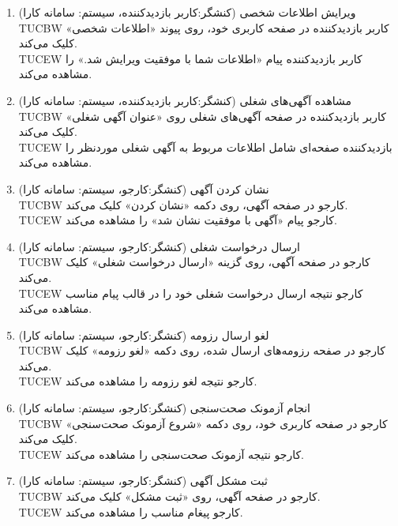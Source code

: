 \documentclass[12pt]{article}
\begin{document}
\begin{enumerate}
		\item
		ویرایش اطلاعات شخصی (کنشگر:‌کاربر بازدید‌کننده، سیستم: سامانه کارا)\\
		TUCBW کاربر بازدید‌کننده در صفحه کاربری خود، روی پیوند «اطلاعات شخصی» کلیک می‌کند.\\
		TUCEW کاربر بازدید‌کننده پیام «اطلاعات شما با موفقیت ویرایش شد.» را مشاهده می‌کند.\\

		\item
		مشاهده آگهی‌های شغلی (کنشگر:‌کاربر بازدید‌کننده، سیستم: سامانه کارا)\\
		TUCBW کاربر بازدید‌کننده در صفحه آگهی‌های شغلی روی «عنوان آگهی شغلی» کلیک می‌کند.\\
		TUCEW بازدید‌کننده صفحه‌ای شامل اطلاعات مربوط به  آگهی شغلی مورد‌نظر را مشاهده می‌کند.\\

		\item
		نشان کردن آگهی (کنشگر:‌کارجو، سیستم: سامانه کارا)\\
		TUCBW کارجو در صفحه آگهی، روی دکمه «نشان کردن» کلیک می‌کند.\\
		TUCEW کارجو پیام «آگهی با موفقیت نشان شد» را مشاهده می‌کند.\\

		\item
		ارسال درخواست شغلی (کنشگر:کارجو، سیستم: سامانه کارا)\faStar\\
		TUCBW کارجو در صفحه آگهی، روی گزینه «ارسال درخواست شغلی» کلیک می‌کند.\\
		TUCEW کارجو نتیجه ارسال درخواست شغلی خود را در قالب پیام مناسب مشاهده می‌کند.\\

		\item
		لغو ارسال رزومه  (کنشگر:‌کارجو، سیستم: سامانه کارا)\\
		TUCBW کارجو در صفحه رزومه‌های ارسال شده، روی دکمه «لغو رزومه» کلیک می‌کند.\\
		TUCEW کارجو نتیجه‌ لغو رزومه را مشاهده می‌کند.\\

		\item
		انجام آزمونک‌ صحت‌سنجی (کنشگر:‌کارجو، سیستم: سامانه کارا)\\
		TUCBW کارجو در صفحه کاربری خود، روی دکمه «شروع آزمونک صحت‌سنجی» کلیک می‌کند.\\
		TUCEW کارجو نتیجه‌ آزمونک صحت‌سنجی را مشاهده می‌کند.\\


		\item
		ثبت مشکل آگهی (کنشگر:‌کارجو، سیستم: سامانه کارا)\faStar\\
		TUCBW کارجو در صفحه آگهی، روی «ثبت مشکل» کلیک می‌کند.\\
		TUCEW کارجو پیغام مناسب را مشاهده می‌کند.\\


\end{enumerate}
\end{document}
